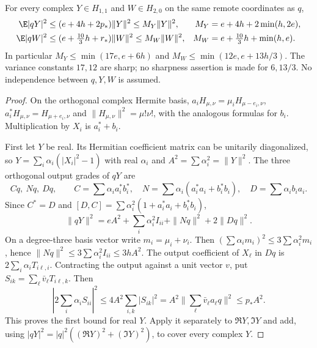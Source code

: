 \begin{lemma}
\label{lem:quadratic-multiplication-refined}
For every complex $Y\in H_{1,1}$ and $W\in H_{2,0}$ on the same
remote coordinates as $q$,
\begin{align}
 \E|qY|^2&\le (e+4h+2p_*)\|Y\|^2\le M_Y\|Y\|^2,
 &M_Y&=e+4h+2\min(h,2e),\label{eq:ase-MY}\\
 \E|qW|^2&\le (e+\tfrac{10}{3}h+r_*)\|W\|^2\le M_W\|W\|^2,
 &M_W&=e+\tfrac{10}{3}h+\min(h,e).\label{eq:ase-MW}
\end{align}
In particular $M_Y\le\min(17e,e+6h)$ and
$M_W\le\min(12e,e+13h/3)$. The variance constants $17,12$ are sharp;
no sharpness assertion is made for $6,13/3$.
No independence between $q,Y,W$ is assumed.
\end{lemma}
\begin{proof}
On the orthogonal complex Hermite basis,
$a_iH_{\mu,\nu}=\mu_iH_{\mu-e_i,\nu}$,
$a_i^*H_{\mu,\nu}=H_{\mu+e_i,\nu}$ and
$\|H_{\mu,\nu}\|^2=\mu!\nu!$, with the analogous formulas for $b_i$.
Multiplication by $X_i$ is $a_i^*+b_i$.

First let $Y$ be real. Its Hermitian coefficient matrix can be
unitarily diagonalized, so $Y=\sum_i\alpha_i(|X_i|^2-1)$ with real
$\alpha_i$ and $A^2=\sum\alpha_i^2=\|Y\|^2$.
The three orthogonal output grades of $qY$ are
\[
 Cq,\ Nq,\ Dq,\qquad
 C=\sum\alpha_i a_i^*b_i^*,\quad
 N=\sum\alpha_i(a_i^*a_i+b_i^*b_i),\quad
 D=\sum\alpha_i b_i a_i.
\]
Since $C^*=D$ and
$[D,C]=\sum\alpha_i^2(1+a_i^*a_i+b_i^*b_i)$,
\begin{equation}\label{eq:quadratic-Y-identity}
 \|qY\|^2=eA^2+\sum_i\alpha_i^2 I_{ii}+\|Nq\|^2+2\|Dq\|^2.
\end{equation}
On a degree-three basis vector write $m_i=\mu_i+\nu_i$.
Then $(\sum\alpha_i m_i)^2\le3\sum\alpha_i^2m_i$, hence
$\|Nq\|^2\le3\sum\alpha_i^2 I_{ii}\le3hA^2$.
The output coefficient of $X_\ell$ in $Dq$ is
$2\sum_i\alpha_iT_{i\ell,i}$. Contracting the output against a unit
vector $v$, put $S_{ik}=\sum_\ell\bar v_\ell T_{i\ell,k}$.
Then
\[
 |2\sum_i\alpha_i S_{ii}|^2\le4A^2\sum_{i,k}|S_{ik}|^2
 =A^2\|\sum_\ell\bar v_\ell a_\ell q\|^2\le p_*A^2.
\]
This proves the first bound for real $Y$. Apply it separately to
$\Re Y,\Im Y$ and add, using $|qY|^2=|q|^2((\Re Y)^2+(\Im Y)^2)$,
to cover every complex $Y$.


\end{proof}

